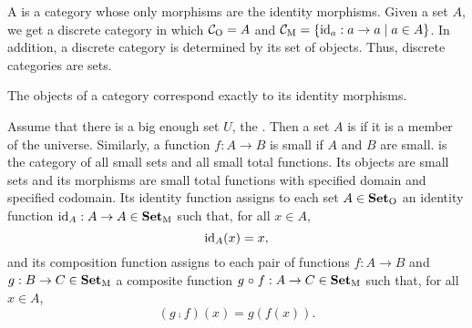 \begin{example}



  \label{ex:discrete-category}


  A  is a category whose only morphisms are
  the identity morphisms. Given a set $A$, we get a discrete category
   in which $\mathcal{C}_{\operatorname{O}} = A$ and $\mathcal{C}_{\operatorname{M}} = \{\operatorname{id}_{a}: a \to a
  \mid a \in A\}$. In addition, a discrete category is determined by
  its set of objects. Thus, discrete categories are sets.

  The objects of a category correspond exactly to its identity morphisms.

\end{example}

\begin{example}




  \label{ex:set}

  \index{\set}


  Assume that there is a big enough set $U$, the . Then
  a set $A$ is  if it is a member of the universe.
  Similarly, a function $f: A \to B$ is small if $A$ and $B$ are
  small.
  \set is the category of all small sets and all small total
  functions. Its objects are small sets and its morphisms are small
  total functions with specified domain and specified codomain. Its
  identity function assigns to each set $A \in \mathcal{\mathbf{Set}}_{\operatorname{O}}$ an
  identity function $\operatorname{id}_{A}: A \to A \in \mathcal{\mathbf{Set}}_{\operatorname{M}}$ such that, for
  all $x \in A$,
  \begin{equation}
    \label{eq:set-identity}
    \operatorname{id}_{A}(x) = x
    \text{,}
  \end{equation}
  and its composition function assigns to each pair of functions $f: A
  \to B$ and $g: B \to C \in \mathcal{\mathbf{Set}}_{\operatorname{M}}$ a composite function $g
  \mathrel{\circ} f: A \to C \in \mathcal{\mathbf{Set}}_{\operatorname{M}}$ such that, for all $x \in A$,
  \begin{equation}
    \label{eq:set-composition}
    (g \comp f)(x) = g(f(x))
    \text{.}
  \end{equation}

\end{example}

